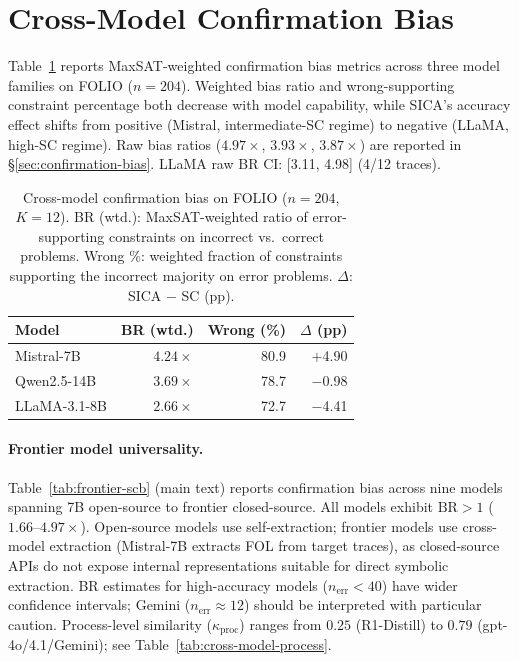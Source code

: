 \section{Cross-Model Confirmation Bias}
\label{app:cross-model-bias}

Table~\ref{tab:cross-model-bias} reports MaxSAT-weighted confirmation bias metrics across three model families on FOLIO ($n = 204$). Weighted bias ratio and wrong-supporting constraint percentage both decrease with model capability, while SICA's accuracy effect shifts from positive (Mistral, intermediate-SC regime) to negative (LLaMA, high-SC regime). Raw bias ratios ($4.97\times$, $3.93\times$, $3.87\times$) are reported in \S\ref{sec:confirmation-bias}. LLaMA raw BR CI: [3.11, 4.98] (4/12 traces).

\begin{table}[h]
\centering
\small
\caption{Cross-model confirmation bias on FOLIO ($n = 204$, $K = 12$). BR (wtd.): MaxSAT-weighted ratio of error-supporting constraints on incorrect vs.\ correct problems. Wrong \%: weighted fraction of constraints supporting the incorrect majority on error problems. $\Delta$: SICA $-$ SC (pp).}
\label{tab:cross-model-bias}
\begin{tabular}{@{}lrrr@{}}
\toprule
Model & BR (wtd.) & Wrong (\%) & $\Delta$ (pp) \\
\midrule
Mistral-7B & $4.24\times$ & 80.9 & $+$4.90 \\
Qwen2.5-14B & $3.69\times$ & 78.7 & $-$0.98 \\
LLaMA-3.1-8B & $2.66\times$ & 72.7 & $-$4.41 \\
\bottomrule
\end{tabular}
\end{table}

\paragraph{Frontier model universality.}
\label{app:frontier-scb}
Table~\ref{tab:frontier-scb} (main text) reports confirmation bias across nine models spanning 7B open-source to frontier closed-source. All models exhibit $\text{BR} > 1$ ($1.66$--$4.97\times$). Open-source models use self-extraction; frontier models use cross-model extraction (Mistral-7B extracts FOL from target traces), as closed-source APIs do not expose internal representations suitable for direct symbolic extraction. BR estimates for high-accuracy models ($n_\text{err} < 40$) have wider confidence intervals; Gemini ($n_\text{err} \approx 12$) should be interpreted with particular caution. Process-level similarity ($\kappa_{\text{proc}}$) ranges from $0.25$ (R1-Distill) to $0.79$ (gpt-4o/4.1/Gemini); see Table~\ref{tab:cross-model-process}.

